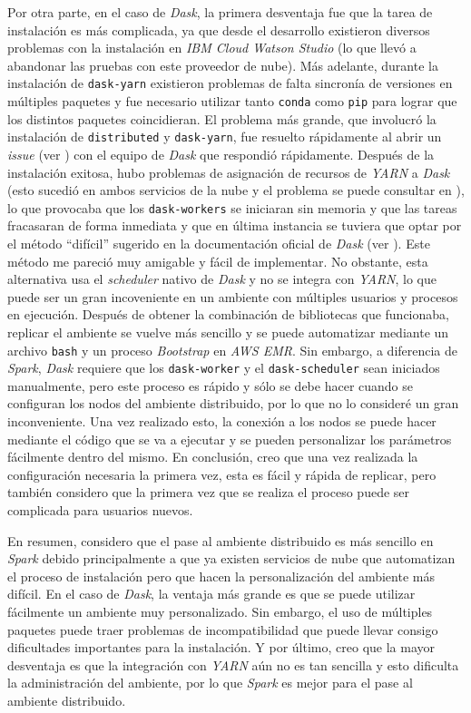 Por otra parte, en el caso de \textit{Dask}, la primera desventaja fue que la tarea de instalación es más complicada, ya que desde el desarrollo existieron diversos problemas con la instalación en \textit{IBM Cloud Watson Studio} (lo que llevó a abandonar las pruebas con este proveedor de nube). Más adelante, durante la instalación de \texttt{dask-yarn} existieron problemas de falta sincronía de versiones en múltiples paquetes y fue necesario utilizar tanto \texttt{conda} como \texttt{pip} para lograr que los distintos paquetes coincidieran. El problema más grande, que involucró la instalación de \texttt{distributed} y \texttt{dask-yarn}, fue resuelto rápidamente al abrir un \textit{issue} (ver \cite{issue-dask-yarn}) con el equipo de \textit{Dask} que respondió rápidamente. Después de la instalación exitosa, hubo problemas de asignación de recursos de \textit{YARN} a \textit{Dask} (esto sucedió en ambos servicios de la nube y el problema se puede consultar en \cite{q-dask-yarn}), lo que provocaba que los \texttt{dask-workers} se iniciaran sin memoria y que las tareas fracasaran de forma inmediata y que en última instancia se tuviera que optar por el método ``difícil'' sugerido en la documentación oficial de \textit{Dask} (ver \cite{daskdistributedsetup}). Este método me pareció muy amigable y fácil de implementar. No obstante, esta alternativa usa el \textit{scheduler} nativo de \textit{Dask} y no se integra con \textit{YARN}, lo que puede ser un gran incoveniente en un ambiente con múltiples usuarios y procesos en ejecución. Después de obtener la combinación de bibliotecas que funcionaba, replicar el ambiente se vuelve más sencillo y se puede automatizar mediante un archivo \texttt{bash} y un proceso \textit{Bootstrap} en \textit{AWS EMR}. Sin embargo, a diferencia de \textit{Spark}, \textit{Dask} requiere que los \texttt{dask-worker} y el \texttt{dask-scheduler} sean iniciados manualmente, pero este proceso es rápido y sólo se debe hacer cuando se configuran los nodos del ambiente distribuido, por lo que no lo consideré un gran inconveniente. Una vez realizado esto, la conexión a los nodos se puede hacer mediante el código que se va a ejecutar y se pueden personalizar los parámetros fácilmente dentro del mismo. En conclusión, creo que una vez realizada la configuración necesaria la primera vez, esta es fácil y rápida de replicar, pero también considero que la primera vez que se realiza el proceso puede ser complicada para usuarios nuevos. 

En resumen, considero que el pase al ambiente distribuido es más sencillo en \textit{Spark} debido principalmente a que ya existen servicios de nube que automatizan el proceso de instalación pero que hacen la personalización del ambiente más difícil. En el caso de \textit{Dask}, la ventaja más grande es que se puede utilizar fácilmente un ambiente muy personalizado. Sin embargo, el uso de múltiples paquetes puede traer problemas de incompatibilidad que puede llevar consigo dificultades importantes para la instalación. Y por último, creo que la mayor desventaja es que la integración con \textit{YARN} aún no es tan sencilla y esto dificulta la administración del ambiente, por lo que \textit{Spark} es mejor para el pase al ambiente distribuido. 
